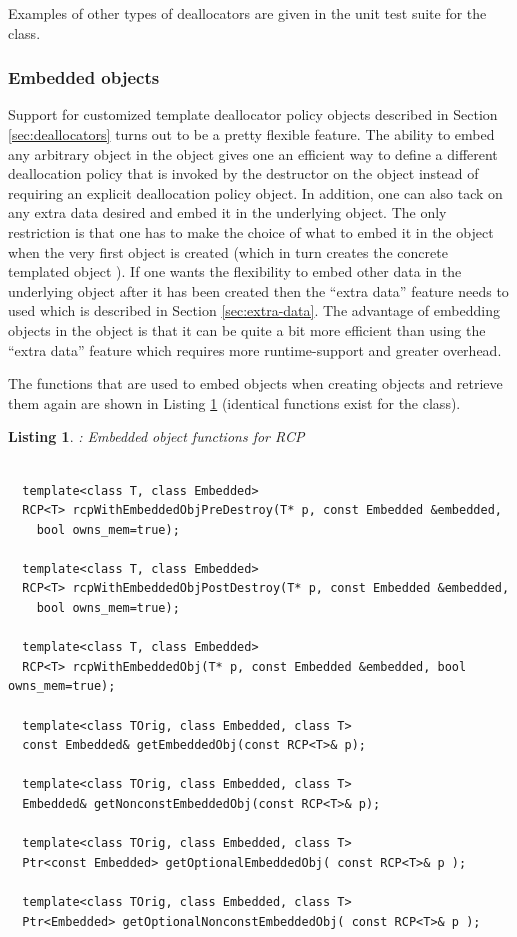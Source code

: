 \documentclass[pdf,ps2pdf,11pt]{SANDreport}
\newtheorem{listing}{Listing}
\begin{document}
Examples of other types of deallocators are given in the unit test
suite for the {} class.


%
{}\subsubsection{Embedded objects}
\label{sec:embedded-objecs}
%

Support for customized template deallocator policy objects described
in Section {}\ref{sec:deallocators} turns out to be a pretty flexible
feature.  The ability to embed any arbitrary object in the
{} object gives one an efficient way to define a
different deallocation policy that is invoked by the destructor on the
object instead of requiring an explicit deallocation policy object.
In addition, one can also tack on any extra data desired and embed it
in the underlying {} object.  The only restriction is
that one has to make the choice of what to embed it in the
{} object when the very first {} object is
created (which in turn creates the concrete templated
{} object ).  If one wants the flexibility to embed
other data in the underlying {} object after it has been
created then the ``extra data'' feature needs to used which is
described in Section {}\ref{sec:extra-data}.  The advantage of
embedding objects in the {} object is that it can be
quite a bit more efficient than using the ``extra data'' feature which
requires more runtime-support and greater overhead.

The functions that are used to embed objects when creating
{} objects and retrieve them again are shown in Listing
{}\ref{listing:RCP-embedded-obj} (identical functions exist for the
{} class).

\begin{listing}: Embedded object functions for RCP \\
\label{listing:RCP-embedded-obj}
{\small\begin{verbatim}
 
  template<class T, class Embedded>
  RCP<T> rcpWithEmbeddedObjPreDestroy(T* p, const Embedded &embedded,
    bool owns_mem=true);
  
  template<class T, class Embedded>
  RCP<T> rcpWithEmbeddedObjPostDestroy(T* p, const Embedded &embedded,
    bool owns_mem=true);
  
  template<class T, class Embedded>
  RCP<T> rcpWithEmbeddedObj(T* p, const Embedded &embedded, bool owns_mem=true);
  
  template<class TOrig, class Embedded, class T> 
  const Embedded& getEmbeddedObj(const RCP<T>& p);
  
  template<class TOrig, class Embedded, class T>
  Embedded& getNonconstEmbeddedObj(const RCP<T>& p);
  
  template<class TOrig, class Embedded, class T>
  Ptr<const Embedded> getOptionalEmbeddedObj( const RCP<T>& p );
  
  template<class TOrig, class Embedded, class T>
  Ptr<Embedded> getOptionalNonconstEmbeddedObj( const RCP<T>& p );
\end{verbatim}}
\end{listing}
\end{document}
